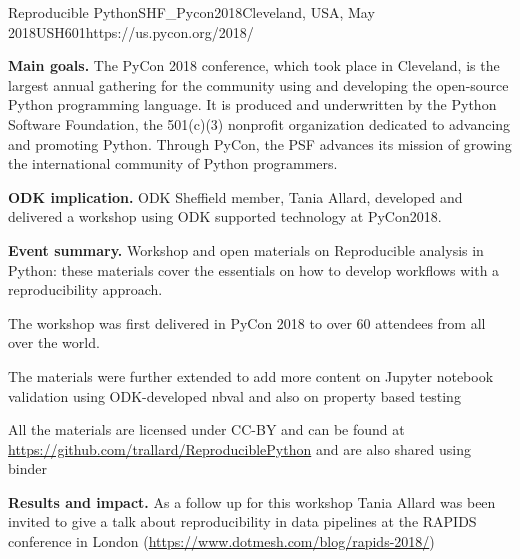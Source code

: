 \begin{event}{Reproducible Python}{SHF_Pycon2018}{Cleveland, USA, May 2018}{USH}{60}{1}{https://us.pycon.org/2018/}

\textbf{Main goals.} The PyCon 2018 conference, which took place in Cleveland, is the largest annual gathering for the community using and developing the open-source Python programming language. It is produced and underwritten by the Python Software Foundation, the 501(c)(3) nonprofit organization dedicated to advancing and promoting Python. Through PyCon, the PSF advances its mission of growing the international community of Python programmers.

\textbf{ODK implication.} ODK Sheffield member, Tania Allard, developed and delivered a workshop using ODK supported technology at PyCon2018.

\textbf{Event summary.} Workshop and open materials on Reproducible analysis in Python: these materials cover the essentials on how to develop workflows with a reproducibility approach.

The workshop was first delivered in PyCon 2018 to over 60 attendees from all over the world.

The materials were further extended to add more content on Jupyter notebook validation using ODK-developed nbval and also on property based testing

All the materials are licensed under CC-BY and can be found at \url{https://github.com/trallard/ReproduciblePython} and are also shared using binder

\textbf{Results and impact.} As a follow up for this workshop Tania Allard was been invited to give a talk about reproducibility in data pipelines at the RAPIDS conference in London (\url{https://www.dotmesh.com/blog/rapids-2018/})

\end{event}
